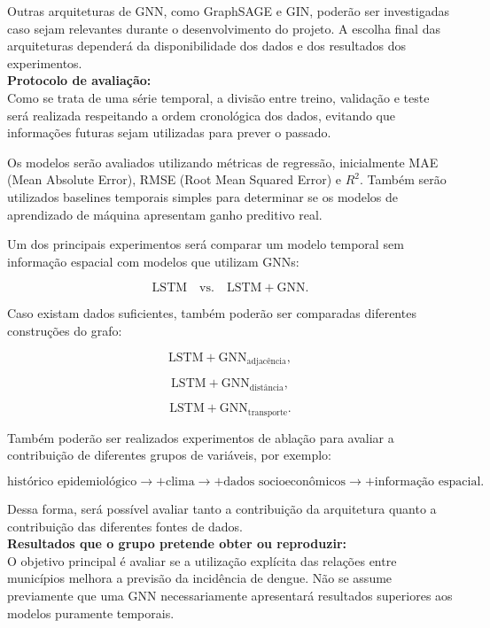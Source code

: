 \documentclass{article}
\begin{document}
Outras arquiteturas de GNN, como GraphSAGE e GIN, poderão ser investigadas caso sejam relevantes durante o desenvolvimento do projeto. A escolha final das arquiteturas dependerá da disponibilidade dos dados e dos resultados dos experimentos. \\

\textbf{Protocolo de avaliação:} \\
Como se trata de uma série temporal, a divisão entre treino, validação e teste será realizada respeitando a ordem cronológica dos dados, evitando que informações futuras sejam utilizadas para prever o passado.

Os modelos serão avaliados utilizando métricas de regressão, inicialmente MAE (Mean Absolute Error), RMSE (Root Mean Squared Error) e $R^2$. Também serão utilizados baselines temporais simples para determinar se os modelos de aprendizado de máquina apresentam ganho preditivo real.

Um dos principais experimentos será comparar um modelo temporal sem informação espacial com modelos que utilizam GNNs:

\[
\mathrm{LSTM}
\quad\text{vs.}\quad
\mathrm{LSTM + GNN}.
\]

Caso existam dados suficientes, também poderão ser comparadas diferentes construções do grafo:

\[
\mathrm{LSTM + GNN}_{\text{adjacência}},
\]

\[
\mathrm{LSTM + GNN}_{\text{distância}},
\]

\[
\mathrm{LSTM + GNN}_{\text{transporte}}.
\]

Também poderão ser realizados experimentos de ablação para avaliar a contribuição de diferentes grupos de variáveis, por exemplo:

\[
\text{histórico epidemiológico}
\rightarrow
+\text{clima}
\rightarrow
+\text{dados socioeconômicos}
\rightarrow
+\text{informação espacial}.
\]

Dessa forma, será possível avaliar tanto a contribuição da arquitetura quanto a contribuição das diferentes fontes de dados. \\

\textbf{Resultados que o grupo pretende obter ou reproduzir:} \\
O objetivo principal é avaliar se a utilização explícita das relações entre municípios melhora a previsão da incidência de dengue. Não se assume previamente que uma GNN necessariamente apresentará resultados superiores aos modelos puramente temporais.
\end{document}
